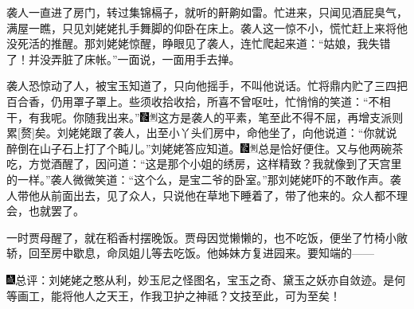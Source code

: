 袭人一直进了房门，转过集锦槅子，就听的鼾齁如雷。忙进来，只闻见酒屁臭气，满屋一瞧，只见刘姥姥扎手舞脚的仰卧在床上。袭人这一惊不小，慌忙赶上来将他没死活的推醒。那刘姥姥惊醒，睁眼见了袭人，连忙爬起来道：``姑娘，我失错了！并没弄脏了床帐。''一面说，一面用手去掸。

袭人恐惊动了人，被宝玉知道了，只向他摇手，不叫他说话。忙将鼎内贮了三四把百合香，仍用罩子罩上。些须收拾收拾，所喜不曾呕吐，忙悄悄的笑道：``不相干，有我呢。你随我出来。''{\includegraphics[width=3mm]{../Images/00006}\includegraphics[width=3mm]{../Images/00011}\footnotesize \kaishu 这方是袭人的平素，笔至此不得不屈，再增支派则累{[}赘{]}矣。}刘姥姥跟了袭人，出至小丫头们房中，命他坐了，向他说道：``你就说醉倒在山子石上打了个盹儿。''刘姥姥答应知道。{\includegraphics[width=3mm]{../Images/00006}\includegraphics[width=3mm]{../Images/00011}\footnotesize \kaishu 总是恰好便住。}又与他两碗茶吃，方觉酒醒了，因问道：``这是那个小姐的绣房，这样精致？我就像到了天宫里的一样。''袭人微微笑道：``这个么，是宝二爷的卧室。''那刘姥姥吓的不敢作声。袭人带他从前面出去，见了众人，只说他在草地下睡着了，带了他来的。众人都不理会，也就罢了。

一时贾母醒了，就在稻香村摆晚饭。贾母因觉懒懒的，也不吃饭，便坐了竹椅小敞轿，回至房中歇息，命凤姐儿等去吃饭。他姊妹方复进园来。要知端的------

{\includegraphics[width=3mm]{../Images/00005}总评：刘姥姥之憨从利，妙玉尼之怪图名，宝玉之奇、黛玉之妖亦自敛迹。是何等画工，能将他人之天王，作我卫护之神祗？文技至此，可为至矣！}
